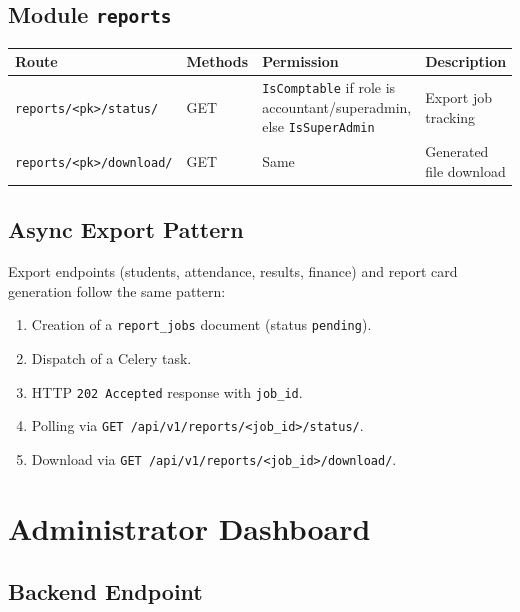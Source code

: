 \documentclass[11pt,a4paper]{article}
\begin{document}
\subsection{Module \texttt{reports}}

\begin{longtable}{@{}lllp{5.5cm}@{}}
\toprule
\textbf{Route} & \textbf{Methods} & \textbf{Permission} & \textbf{Description} \\
\midrule
\endhead
\texttt{reports/<pk>/status/} & GET & \texttt{IsComptable} if role is accountant/superadmin, else \texttt{IsSuperAdmin} & Export job tracking \\
\texttt{reports/<pk>/download/} & GET & Same & Generated file download \\
\bottomrule
\end{longtable}

\subsection{Async Export Pattern}
\label{sec:async-exports}

Export endpoints (students, attendance, results, finance) and report card generation follow the same pattern:

\begin{enumerate}[noitemsep]
    \item Creation of a \texttt{report\_jobs} document (status \texttt{pending}).
    \item Dispatch of a Celery task.
    \item HTTP \texttt{202 Accepted} response with \texttt{job\_id}.
    \item Polling via \texttt{GET /api/v1/reports/<job\_id>/status/}.
    \item Download via \texttt{GET /api/v1/reports/<job\_id>/download/}.
\end{enumerate}

\section{Administrator Dashboard}
\label{sec:admin-dashboard}

\subsection{Backend Endpoint}
\end{document}
